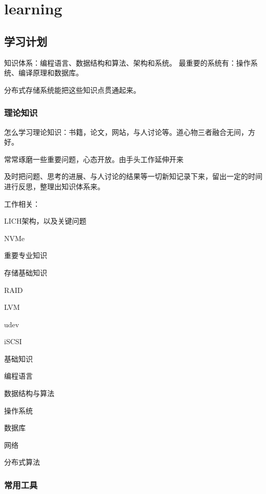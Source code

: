 \chapter{learning}

\section{学习计划}

知识体系：编程语言、数据结构和算法、架构和系统。
最重要的系统有：操作系统、编译原理和数据库。

分布式存储系统能把这些知识点贯通起来。

\subsection{理论知识}

怎么学习理论知识：书籍，论文，网站，与人讨论等。道心物三者融合无间，方好。

常常琢磨一些重要问题，心态开放。由手头工作延伸开来

及时把问题、思考的进展、与人讨论的结果等一切新知记录下来，留出一定的时间进行反思，整理出知识体系来。


工作相关：
\begin{enumbox}
\item LICH架构，以及关键问题
\item NVMe
\end{enumbox}

重要专业知识
\begin{enumbox}
\item 存储基础知识
\item RAID
\item LVM
\item udev
\item iSCSI
\end{enumbox}

基础知识
\begin{enumbox}
\item 编程语言
\item 数据结构与算法
\item 操作系统
\item 数据库
\item 网络
\item 分布式算法
\end{enumbox}

\subsection{常用工具}

